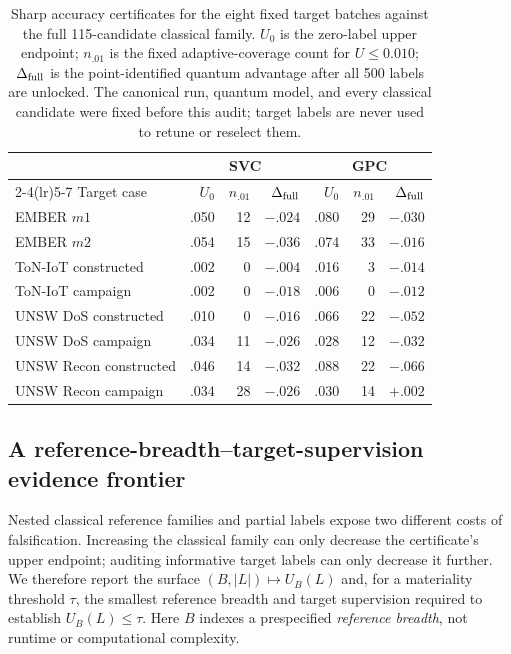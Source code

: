 \documentclass[referee,lineno,pdflatex,sn-vancouver-num]{sn-jnl}
\theoremstyle{thmstyleone}%
\theoremstyle{thmstyletwo}%
\theoremstyle{thmstylethree}%
\begin{document}
\begin{table}[t]
\centering
\caption{Sharp accuracy certificates for the eight fixed target batches against the full 115-candidate classical family. $U_0$ is the zero-label upper endpoint; $n_{.01}$ is the fixed adaptive-coverage count for $U\leq0.010$; $\Delta_{\rm full}$ is the point-identified quantum advantage after all 500 labels are unlocked. The canonical run, quantum model, and every classical candidate were fixed before this audit; target labels are never used to retune or reselect them.}
\label{tab:v9_certificate}
\scriptsize
\setlength{\tabcolsep}{4pt}
\begin{tabular}{@{}lrrr@{\qquad}rrr@{}}
\toprule
& \multicolumn{3}{c}{SVC} & \multicolumn{3}{c}{GPC}\\
\cmidrule(lr){2-4}\cmidrule(lr){5-7}
Target case & $U_0$ & $n_{.01}$ & $\Delta_{\rm full}$ &
$U_0$ & $n_{.01}$ & $\Delta_{\rm full}$\\
\midrule
EMBER $m1$                 & .050 & 12 & $-.024$ & .080 & 29 & $-.030$\\
EMBER $m2$                 & .054 & 15 & $-.036$ & .074 & 33 & $-.016$\\
ToN-IoT constructed        & .002 &  0 & $-.004$ & .016 &  3 & $-.014$\\
ToN-IoT campaign           & .002 &  0 & $-.018$ & .006 &  0 & $-.012$\\
UNSW DoS constructed       & .010 &  0 & $-.016$ & .066 & 22 & $-.052$\\
UNSW DoS campaign          & .034 & 11 & $-.026$ & .028 & 12 & $-.032$\\
UNSW Recon constructed     & .046 & 14 & $-.032$ & .088 & 22 & $-.066$\\
UNSW Recon campaign        & .034 & 28 & $-.026$ & .030 & 14 & $+.002$\\
\bottomrule
\end{tabular}
\end{table}

\subsection{A reference-breadth--target-supervision evidence frontier}
\label{sec:res_frontier}

Nested classical reference families and partial labels expose two different costs of falsification. Increasing the classical family can only decrease the certificate's upper endpoint; auditing informative target labels can only decrease it further. We therefore report the surface $(B,|L|)\mapsto U_B(L)$ and, for a materiality threshold $\tau$, the smallest reference breadth and target supervision required to establish $U_B(L)\leq\tau$. Here $B$ indexes a prespecified \emph{reference breadth}, not runtime or computational complexity.
\end{document}

